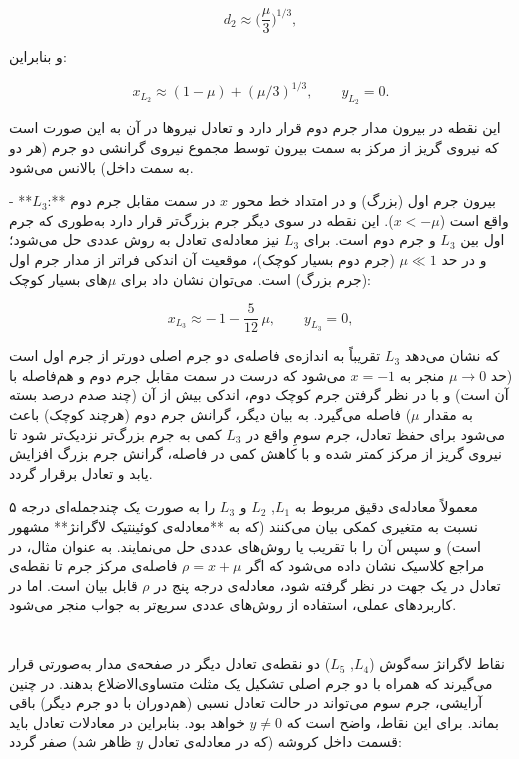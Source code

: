 $$d_2 \approx \Big(\frac{\mu}{3}\Big)^{1/3},$$ 

و بنابراین: 

$$x_{L_2} \approx (1-\mu) + (\mu/3)^{1/3}, \qquad y_{L_2}=0.$$ 

این نقطه در بیرون مدار جرم دوم قرار دارد و تعادل نیروها در آن به این صورت است که نیروی گریز از مرکز به سمت بیرون توسط مجموع نیروی گرانشی دو جرم (هر دو به سمت داخل) بالانس می‌شود. 

- **$L_3$:** بیرون جرم اول (بزرگ) و در امتداد خط محور $x$ در سمت مقابل جرم دوم واقع است ($x < -\mu$). این نقطه در سوی دیگر جرم بزرگ‌تر قرار دارد به‌طوری که جرم اول بین $L_3$ و جرم دوم است. برای $L_3$ نیز معادله‌ی تعادل به روش عددی حل می‌شود؛ و در حد $\mu \ll 1$ (جرم دوم بسیار کوچک)، موقعیت آن اندکی فراتر از مدار جرم اول (جرم بزرگ) است. می‌توان نشان داد برای $\mu$های بسیار کوچک: 

$$x_{L_3} \approx -\,1 - \frac{5}{12}\,\mu, \qquad y_{L_3}=0,$$ 

که نشان می‌دهد $L_3$ تقریباً به اندازه‌ی فاصله‌ی دو جرم اصلی دورتر از جرم اول است (حد $\mu \to 0$ منجر به $x=-1$ می‌شود که درست در سمت مقابل جرم دوم و هم‌فاصله با آن است) و با در نظر گرفتن جرم کوچک دوم، اندکی بیش از آن (چند صدم درصد بسته به مقدار $\mu$) فاصله می‌گیرد. به بیان دیگر، گرانش جرم دوم (هرچند کوچک) باعث می‌شود برای حفظ تعادل، جرم سومِ واقع در $L_3$ کمی به جرم بزرگ‌تر نزدیک‌تر شود تا نیروی گریز از مرکز کمتر شده و با کاهش کمی در فاصله، گرانش جرم بزرگ افزایش یابد و تعادل برقرار گردد.  

معمولاً معادله‌ی دقیق مربوط به $L_1$, $L_2$ و $L_3$ را به صورت یک چندجمله‌ای درجه ۵ نسبت به متغیری کمکی بیان می‌کنند (که به **معادله‌ی کوئینتیک لاگرانژ** مشهور است) و سپس آن را با تقریب یا روش‌های عددی حل می‌نمایند. به عنوان مثال، در مراجع کلاسیک نشان داده می‌شود که اگر $\rho = x + \mu$ فاصله‌ی مرکز جرم تا نقطه‌ی تعادل در یک جهت در نظر گرفته شود، معادله‌ی درجه پنج در $\rho$ قابل بیان است. اما در کاربردهای عملی، استفاده از روش‌های عددی سریع‌تر به جواب منجر می‌شود. 

\section{} نقاط لاگرانژ سه‌گوش ($L_4$, $L_5$)  
دو نقطه‌ی تعادل دیگر در صفحه‌ی مدار به‌صورتی قرار می‌گیرند که همراه با دو جرم اصلی تشکیل یک مثلث متساوی‌الاضلاع بدهند. در چنین آرایشی، جرم سوم می‌تواند در حالت تعادل نسبی (هم‌دوران با دو جرم دیگر) باقی بماند. برای این نقاط، واضح است که $y \neq 0$ خواهد بود. بنابراین در معادلات تعادل باید قسمت داخل کروشه (که در معادله‌ی تعادل $y$ ظاهر شد) صفر گردد:

